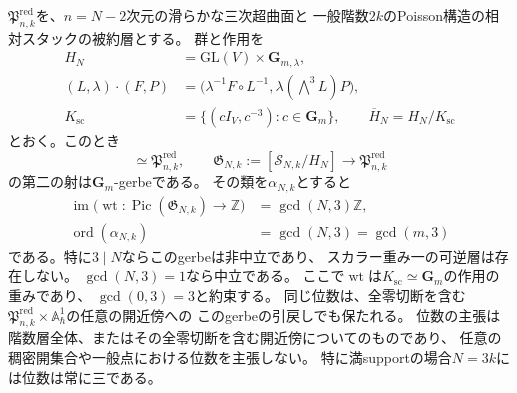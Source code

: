 \begin{proposition}[全非零階数層の商とgerbeの正確な位数]
\label{prop:pg-intrinsic-all-rank-gerbe}
$\mathfrak P_{n,k}^{\mathrm{red}}$を、$n=N-2$次元の滑らかな三次超曲面と
一般階数$2k$のPoisson構造の相対スタックの被約層とする。
群と作用を
\begin{equation}
 \begin{aligned}
 H_N&=\mathrm{GL}(V)\times\mathbf G_{m,\lambda},\\
 (L,\lambda)\cdot(F,P)
   &=\bigl(\lambda^{-1}F\circ L^{-1},
            \lambda(\bigwedge^3L)P\bigr),\\
 K_{\mathrm{sc}}&=\{(cI_V,c^{-3}):c\in\mathbf G_m\},
 \qquad\overline H_N=H_N/K_{\mathrm{sc}}
 \end{aligned}
 \label{eq:pg-intrinsic-all-rank-action}
\end{equation}
とおく。このとき
\begin{equation}
 [\mathcal S_{N,k}/\overline H_N]
    \simeq\mathfrak P_{n,k}^{\mathrm{red}},\qquad
 \mathfrak G_{N,k}:=[\mathcal S_{N,k}/H_N]
    \longrightarrow\mathfrak P_{n,k}^{\mathrm{red}}
 \label{eq:pg-intrinsic-all-rank-quotient}
\end{equation}
の第二の射は$\mathbf G_m$-gerbeである。
その類を$\alpha_{N,k}$とすると
\begin{equation}
 \begin{aligned}
 \operatorname{im}\bigl(\operatorname{wt}:\operatorname{Pic}(\mathfrak G_{N,k})
                                  \longrightarrow\mathbb Z\bigr)
     &=\gcd(N,3)\mathbb Z,\\
 \operatorname{ord}(\alpha_{N,k})
     &=\gcd(N,3)=\gcd(m,3)
 \end{aligned}
 \label{eq:pg-intrinsic-all-rank-period}
\end{equation}
である。特に$3\mid N$ならこのgerbeは非中立であり、
スカラー重み一の可逆層は存在しない。
$\gcd(N,3)=1$なら中立である。
ここで$\operatorname{wt}$は$K_{\mathrm{sc}}\simeq\mathbf G_m$の作用の重みであり、
$\gcd(0,3)=3$と約束する。
同じ位数は、全零切断を含む
$\mathfrak P_{n,k}^{\mathrm{red}}\times\mathbb A^1_\hbar$の任意の開近傍への
このgerbeの引戻しでも保たれる。
位数の主張は階数層全体、またはその全零切断を含む開近傍についてのものであり、
任意の稠密開集合や一般点における位数を主張しない。
特に満supportの場合$N=3k$には位数は常に三である。
\end{proposition}
